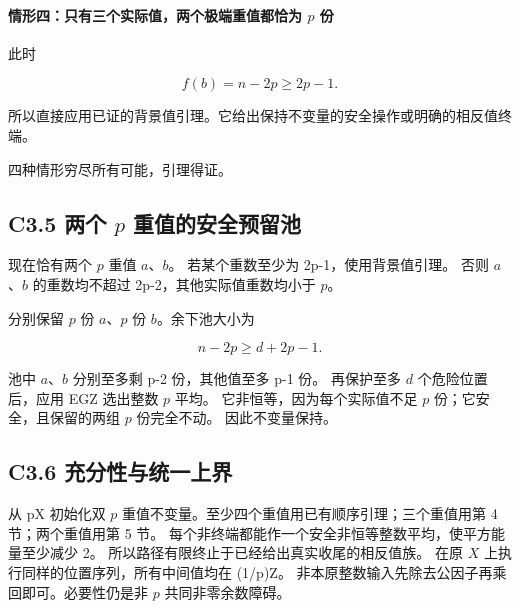 \documentclass[11pt,a4paper]{article}
\theoremstyle{definition}
\numberwithin{equation}{section}
\begin{document}
\paragraph*{\texorpdfstring{{情形四：只有三个实际值，两个极端重值都恰为} {\ensuremath{p}} {份}}{情形四：只有三个实际值，两个极端重值都恰为  份}}\label{C3-h17}

{此时}

\[
f(b)=n-2p\ge2p-1.
\]

{所以直接应用已证的背景值引理。它给出保持不变量的安全操作或明确的相反值终端。}

{四种情形穷尽所有可能，引理得证。}

\subsection*{\texorpdfstring{{C3.5} {两个} {\ensuremath{p}} {重值的安全预留池}}{C3.5 两个  重值的安全预留池}}\label{C3-h18}

{现在恰有两个} {\ensuremath{p}} {重值} {\ensuremath{a}、\ensuremath{b}。} {若某个重数至少为} {2p-1，使用背景值引理。} {否则} {\ensuremath{a}、\ensuremath{b}} {的重数均不超过} {2p-2，其他实际值重数均小于} {\ensuremath{p}。}

{分别保留} {\ensuremath{p}} {份} {\ensuremath{a}、\ensuremath{p}} {份} {\ensuremath{b}。余下池大小为}

\[
n-2p\ge d+2p-1.
\]

{池中} {\ensuremath{a}、\ensuremath{b}} {分别至多剩} {p-2} {份，其他值至多} {p-1} {份。} {再保护至多} {\ensuremath{d}} {个危险位置后，应用} {EGZ} {选出整数} {\ensuremath{p}} {平均。} {它非恒等，因为每个实际值不足} {\ensuremath{p}} {份；它安全，且保留的两组} {\ensuremath{p}} {份完全不动。} {因此不变量保持。}

\subsection*{\texorpdfstring{{C3.6} {充分性与统一上界}}{C3.6 充分性与统一上界}}\label{C3-h19}

{从} {pX} {初始化双} {\ensuremath{p}} {重值不变量。至少四个重值用已有顺序引理；三个重值用第} {4} {节；两个重值用第} {5} {节。} {每个非终端都能作一个安全非恒等整数平均，使平方能量至少减少} {2。} {所以路径有限终止于已经给出真实收尾的相反值族。} {在原} {\ensuremath{X}} {上执行同样的位置序列，所有中间值均在} {(1/p)Z。} {非本原整数输入先除去公因子再乘回即可。必要性仍是非} {\ensuremath{p}} {共同非零余数障碍。}
\end{document}
